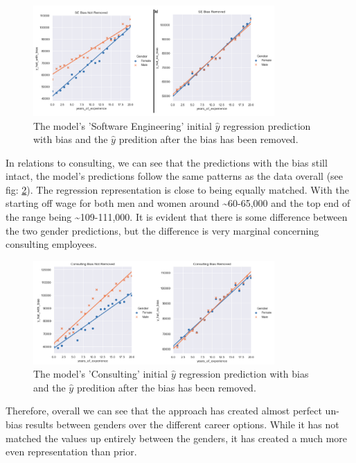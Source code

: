 \documentclass{sigchi}
\begin{document}
	\begin{figure}[h]
		\includegraphics[width=9.2cm]{se_comparison.png}
		\caption{The model's 'Software Engineering' initial $\hat{y}$ regression prediction with bias and the $\hat{y}$ predition after the bias has been removed.}
		\label{fig:se_comparison}
		\centering
	\end{figure}

	In relations to consulting, we can see that the predictions with the bias still intact, the model's predictions follow the same patterns as the data overall (see fig: \ref{fig:consulting_comparison}).  The regression representation is close to being equally matched. With the starting off wage for both men and women around \textasciitilde{60-65,000} and the top end of the range being \textasciitilde{109-111,000}. It is evident that there is some difference between the two gender predictions, but the difference is very marginal concerning consulting employees. 

	\begin{figure}[h]
		\includegraphics[width=9.2cm]{consulting_comparison.png}
		\caption{The model's 'Consulting' initial $\hat{y}$ regression prediction with bias and the $\hat{y}$ predition after the bias has been removed.}
		\label{fig:consulting_comparison}
		\centering
	\end{figure}

	Therefore, overall we can see that the approach has created almost perfect un-bias results between genders over the different career options. While it has not matched the values up entirely between the genders, it has created a much more even representation than prior. 

\end{document}
